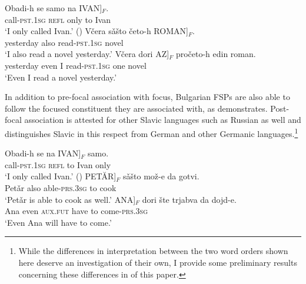 \documentclass[output=paper,colorlinks,citecolor=brown]{langscibook}
\begin{document}
\ea\label{Bulgarian:basic1}
\ea
\gll Obadi-h se samo \minsp{[} na IVAN]$_{F}$. \\
call-\textsc{pst.1sg} \textsc{refl} only {} to Ivan \\
\glt ‘I only called Ivan.’ \hfill (\citealt[ex. 8a]{TishevaDzhonova2003})
\ex
\gll V\v{c}era s\v{a}\v{s}to \minsp{[} \v{c}eto-h ROMAN]$_{F}$. \\
yesterday also {} read-\textsc{pst.1sg} novel \\
\glt ‘I also read a novel yesterday.’
\ex
\gll V\v{c}era dori \minsp{[} AZ]$_{F}$ pro\v{c}eto-h edin roman. \\
yesterday even {} I read-\textsc{pst.1sg} one novel \\
\glt ‘Even I read a novel yesterday.’
\z
\z

\noindent In addition to pre-focal association with focus, Bulgarian FSPs are also able to follow the focused constituent they are associated with, as  demonstrates. Post-focal association is attested for other Slavic languages such as Russian as well and distinguishes Slavic in this respect from German and other Germanic languages.\footnote{While the differences in interpretation between the two word orders shown here deserve an investigation of their own, I provide some preliminary results concerning these differences in  of this paper.} 

\ea\label{Bulgarian:basic2}
\ea
\gll Obadi-h se \minsp{[} na IVAN]$_{F}$ samo. \\
call-\textsc{pst.1sg} \textsc{refl} {} to Ivan only\\
\glt ‘I only called Ivan.’ \hfill (\citealt[ex. 8a]{TishevaDzhonova2003})
\ex
\gll \minsp{[} PETĂR]$_{F}$ s\v{a}\v{s}to mo\v{z}-e da gotvi. \\
{} Petǎr also able-\textsc{prs.3sg} to cook\\
\glt ‘Petǎr is able to cook as well.’
\ex
\gll \minsp{[} ANA]$_{F}$ dori \v{s}te trjabva da dojd-e. \\
{} Ana even \textsc{aux.fut} have to come-\textsc{prs.3sg} \\
\glt ‘Even Ana will have to come.’
\z
\z
\end{document}
